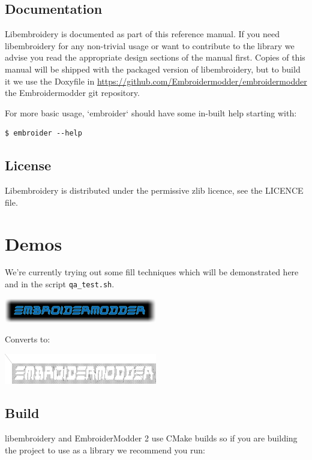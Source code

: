 \documentclass[11pt]{report}
\begin{document}
\subsection{Documentation}

Libembroidery is documented as part of this reference manual. If you need
libembroidery for any non-trivial usage or want to contribute to the library we
advise you read the appropriate design sections of the manual first. Copies of
this manual will be shipped with the packaged version of libembroidery, but to
build it we use the Doxyfile in
\url{https://github.com/Embroidermodder/embroidermodder} the Embroidermodder git
repository.

For more basic usage, `embroider` should have some in-built help
starting with:

\begin{lstlisting}
$ embroider --help
\end{lstlisting}

\subsection{License}

Libembroidery is distributed under the permissive zlib licence, see the LICENCE
file.

\section{Demos}

We're currently trying out some fill techniques which will be demonstrated here
and in the script \texttt{qa\_test.sh}.

\includegraphics[width=0.5\textwidth]{images/examples/logo.png}

Converts to:

\includegraphics[width=0.5\textwidth]{images/examples/crossstitch_logo.png}

\subsection{Build}

libembroidery and EmbroiderModder 2 use CMake builds
so if you are building the project to use as a library we recommend
you run:
\end{document}

